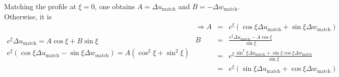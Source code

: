 \documentclass[a4paper,11pt]{article}
\newcommand{\gzm}{{\xi}}%
\begin{document}
Matching the profile at $\xi=0$, one obtains
$A = \Delta u_\text{match} $ and $B=-\Delta w_\text{match} $. Otherwise, it is
\begin{subequations} 
\begin{eqnarray}
  e^\gzm \Delta u_\text{match} = A \cos\gzm + B\sin\gzm \\
  e^\gzm (\cos\gzm \Delta u_\text{match} - \sin\gzm \Delta w_\text{match}) = A (\cos^2\gzm + \sin^2\gzm)
\end{eqnarray}
\begin{eqnarray}
  \Rightarrow A &=&e^\gzm (\cos\gzm\Delta u_\text{match} + \sin\gzm \Delta w_\text{match})\\
  B&=&  \frac{e^\gzm \Delta u_\text{match} - A \cos \gzm}{\sin\gzm} \\
  &=& e^\gzm \frac{ \sin^2\gzm \Delta u_\text{match}+\sin\xi\cos\xi \Delta w_\text{match} }{\sin\xi }  \\
  &=& e^\gzm (\sin\xi\Delta u_\text{match} + \cos\xi\Delta w_\text{match}) 
\end{eqnarray}
\end{subequations} 


\end{document}
